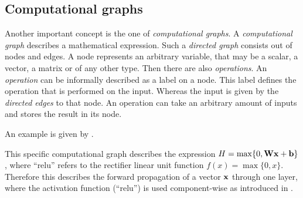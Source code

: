 \subsection{Computational graphs}
\label{sec:computational-graphs}

Another important concept is the one of \emph{computational graphs}.
A \emph{computational graph} describes a mathematical expression.
Such a \emph{directed graph} consists out of nodes and edges.
A node represents an arbitrary variable, that may be a scalar, a vector, a matrix or of any other type.
Then there are also \emph{operations}.
An \emph{operation} can be informally described as a label on a node.
This label defines the operation that is performed on the input.
Whereas the input is given by the \emph{directed edges} to that node.
An operation can take an arbitrary amount of inputs and stores the result in its node.

An example is given by .


This specific computational graph describes the expression \(H = \max\{0, \mathbf{W}\mathbf{x} + \mathbf{b}\}\), 
where \enquote{relu} refers to the rectifier linear unit function \(f(x) = \max\{0, x\}\).
Therefore this describes the forward propagation of a vector \(\mathbf{x}\) through one layer, where the activation function (\enquote{relu}) is used component-wise as introduced in .